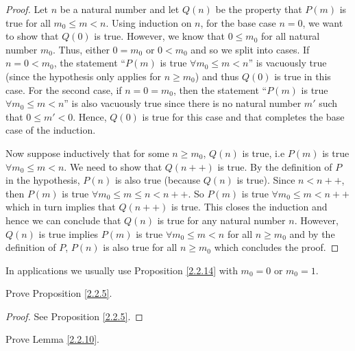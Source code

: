 \begin{proof}
    Let \(n\) be a natural number and let \(Q(n)\) be the property that \(P(m)\) is true for all \(m_0 \leq m < n\).
    Using induction on \(n\), for the base case \(n = 0\), we want to show that \(Q(0)\) is true.
    However, we know that \(0 \leq m_0\) for all natural number \(m_0\).
    Thus, either \(0 = m_0\) or \(0 < m_0\) and so we split into cases.
    If \(n = 0 < m_0\), the statement ``\(P(m)\) is true \(\forall m_0 \leq m < n\)'' is vacuously true (since the hypothesis only applies for \(n \geq m_0\)) and thus \(Q(0)\) is true in this case.
    For the second case, if \(n = 0 = m_0\), then the statement ``\(P(m)\) is true \(\forall m_0 \leq m < n\)'' is also vacuously true since there is no natural number \(m'\) such that \(0 \leq m' < 0\). Hence, \(Q(0)\) is true for this case and that completes the base case of the induction.

    Now suppose inductively that for some \(n \geq m_0\), \(Q(n)\) is true, i.e \(P(m)\) is true \(\forall m_0 \leq m < n\).
    We need to show that \(Q(n++)\) is true.
    By the definition of \(P\) in the hypothesis, \(P(n)\) is also true (because \(Q(n)\) is true).
    Since \(n < n++\), then \(P(m)\) is true \(\forall m_0 \leq m \leq n < n++\).
    So \(P(m)\) is true \(\forall m_0 \leq m < n++\) which in turn implies that \(Q(n++)\) is true.
    This closes the induction and hence we can conclude that \(Q(n)\) is true for any natural number \(n\).
    However, \(Q(n)\) is true implies \(P(m)\) is true \(\forall m_0 \leq m < n\) for all \(n \geq m_0\) and by the definition of \(P\), \(P(n)\) is also true for all \(n \geq m_0\) which concludes the proof.
\end{proof}

\begin{remark}\label{2.2.15}
    In applications we usually use Proposition \ref{2.2.14} with \(m_0 = 0\) or \(m_0 = 1\).
\end{remark}

\exercisesection

\begin{exercise}\label{ex 2.2.1}
    Prove Proposition \ref{2.2.5}.
\end{exercise}

\begin{proof}
    See Proposition \ref{2.2.5}.
\end{proof}

\begin{exercise}\label{ex 2.2.2}
    Prove Lemma \ref{2.2.10}.
\end{exercise}

